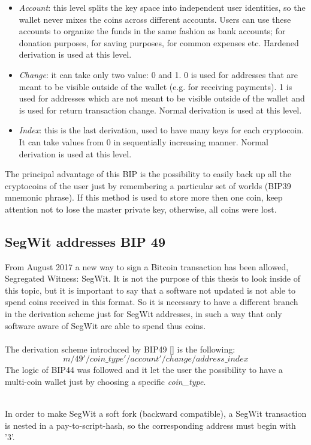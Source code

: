 \begin{itemize}
	\item \textit{Account}: this level splits the key space into independent user identities, so the wallet never mixes the coins across different accounts.
	Users can use these accounts to organize the funds in the same fashion as bank accounts; for donation purposes, for saving purposes, for common expenses etc.
	Hardened derivation is used at this level.
	\item \textit{Change}: it can take only two value: 0 and 1. 0 is used for addresses that are meant to be visible outside of the wallet (e.g. for receiving payments). 1 is used for addresses which are not meant to be visible outside of the wallet and is used for return transaction change.
	Normal derivation is used at this level.
	\item \textit{Index}: this is the last derivation, used to have many keys for each cryptocoin. It can take values from 0 in sequentially increasing manner. Normal derivation is used at this level.
\end{itemize}
The principal advantage of this BIP is the possibility to easily back up all the cryptocoins of the user just by remembering a particular set of worlds (BIP39 mnemonic phrase). If this method is used to store more then one coin, keep attention not to lose the master private key, otherwise, all coins were lost.

\subsection{SegWit addresses BIP 49}
From August 2017 a new way to sign a Bitcoin transaction has been allowed, Segregated Witness: SegWit. It is not the purpose of this thesis to look inside of this topic, but it is important to say that a software not updated is not able to spend coins received in this format. So it is necessary to have a different branch in the derivation scheme just for SegWit addresses, in such a way that only software aware of SegWit are able to spend thus coins.
\\ \\
The derivation scheme introduced by BIP49 [\cite{6}] is the following:
\begin{equation*}
m / 49' / coin\_type' / account' / change / address\_index
\end{equation*}
The logic of BIP44 was followed and it let the user the possibility to have a multi-coin wallet just by choosing a specific \textit{coin\_type}.
\\ \\
\begin{remark}
	In order to make SegWit a soft fork (backward compatible), a SegWit transaction is nested in a pay-to-script-hash, so the corresponding address must begin with '3'.	
\end{remark}




